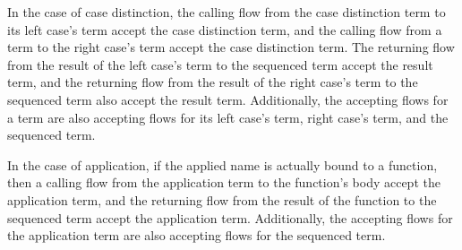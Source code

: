 \documentclass[letterpaper, 11pt]{report}
\begin{document}
In the case of case distinction, the calling flow from the case distinction term to
its left case's term accept the case distinction term, and
the calling flow from a term to
the right case's term accept the case distinction term.
The returning flow from the result of the
left case's term to the sequenced term accept the result term,
and the returning flow from the result of the right case's term to the sequenced term
also accept the result term. Additionally, the accepting flows for a term are also
accepting flows for its left case's term, right case's term,
and the sequenced term.  

In the case of application, if the applied name is actually bound to a function,
then a calling flow from the application term to the function's body 
accept the application term, and the returning flow from the result of the function
 to the sequenced term accept the application term.
Additionally, the accepting flows for the application term are also
accepting flows for the sequenced term. 
\end{document}
